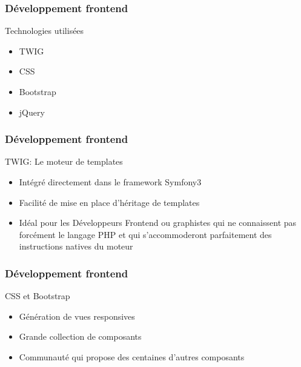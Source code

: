 \speaker{\Juliana}

\begin{frame}
\frametitle{Développement frontend}
\begin{block}{Technologies utilisées}
	\begin{itemize}
		\item TWIG
		\item CSS
		\item Bootstrap
		\item jQuery
	\end{itemize}
\end{block}
\end{frame}

\begin{frame}
\frametitle{Développement frontend}
\begin{block}{TWIG: Le moteur de templates }
	\begin{itemize}
		\item Intégré directement dans le framework Symfony3
		\item Facilité de mise en place d'héritage de templates
		\item Idéal pour les Développeurs Frontend ou graphistes qui ne connaissent pas forcément le langage PHP et qui s'accommoderont parfaitement des instructions natives du moteur
	\end{itemize}
\end{block}
\end{frame}

\begin{frame}
\frametitle{Développement frontend}
\begin{block}{ CSS et Bootstrap }
	\begin{itemize}
		\item Génération de vues responsives
		\item Grande collection de composants
		\item Communauté qui propose des centaines d'autres composants
	\end{itemize}
\end{block}
\end{frame}

